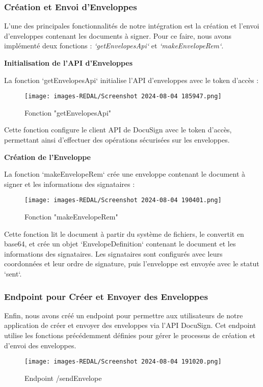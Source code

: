 \subsubsection{ Création et Envoi d'Enveloppes}

L'une des principales fonctionnalités de notre intégration est la création et l'envoi d'enveloppes contenant les documents à signer. Pour ce faire, nous avons implémenté deux fonctions : \textit{`getEnvelopesApi`} et \textit{`makeEnvelopeRem`}.

\textbf{Initialisation de l'API d'Enveloppes}

La fonction `getEnvelopesApi` initialise l'API d'enveloppes avec le token d'accès :

\begin{figure}[H]
\begin{center}
\texttt{[image: images-REDAL/Screenshot 2024-08-04 185947.png]}
\end{center}
\caption{Fonction "getEnvelopesApi"}
\end{figure}



Cette fonction configure le client API de DocuSign avec le token d'accès, permettant ainsi d'effectuer des opérations sécurisées sur les enveloppes.

\newpage
\textbf{ Création de l'Enveloppe}

La fonction `makeEnvelopeRem` crée une enveloppe contenant le document à signer et les informations des signataires :

\begin{figure}[H]
\begin{center}
\texttt{[image: images-REDAL/Screenshot 2024-08-04 190401.png]}
\end{center}
\caption{Fonction "makeEnvelopeRem" }
\end{figure}


Cette fonction lit le document à partir du système de fichiers, le convertit en base64, et crée un objet `EnvelopeDefinition` contenant le document et les informations des signataires. Les signataires sont configurés avec leurs coordonnées et leur ordre de signature, puis l'enveloppe est envoyée avec le statut `sent`.

\subsubsection{ Endpoint pour Créer et Envoyer des Enveloppes}

Enfin, nous avons créé un endpoint pour permettre aux utilisateurs de notre application de créer et envoyer des enveloppes via l'API DocuSign. Cet endpoint utilise les fonctions précédemment définies pour gérer le processus de création et d'envoi des enveloppes.
\begin{figure}[H]
\begin{center}
\texttt{[image: images-REDAL/Screenshot 2024-08-04 191020.png]}
\end{center}
\caption{Endpoint /sendEnvelope}
\end{figure}

